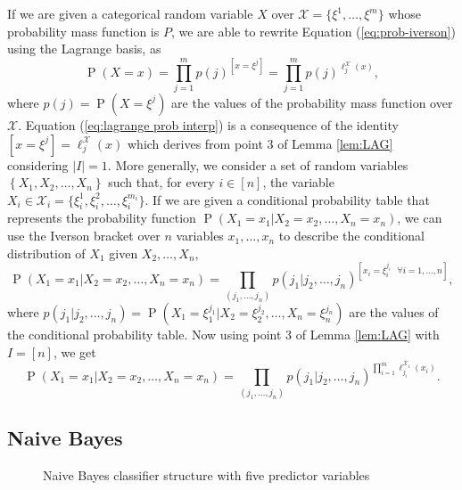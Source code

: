 \documentclass[11pt,a4paper, twoside]{book}
\newcommand{\Pp}{\operatorname{P}}
\newcommand{\nchi}{\mathcal{X}}
\begin{document}
If we are given a categorical random variable $X$ over $\nchi=\{\xi^1,\ldots,\xi^m\}$ whose probability mass function is $P$, we are able to rewrite Equation (\ref{eq:prob-iverson}) using the Lagrange basis, as
\begin{equation} \Pp(X=x)=\prod_{j=1}^m p(j)^{[x=\xi^j]}=\prod_{j=1}^m p(j)^{\ell_j^{\nchi}(x)}, 
\label{eq:lagrange prob interp}
\end{equation} 
where $p(j)=\Pp(X=\xi^j)$ are the values of the probability mass function over $\nchi$. Equation (\ref{eq:lagrange prob interp}) is a consequence of the identity $[x=\xi^j]=\ell_j^{\nchi}(x)$ which derives from point 3 of Lemma \ref{lem:LAG} considering $|I|=1$.
More generally, we consider a set of random variables $\left\{X_1, X_2, \ldots, X_n \right\}$ such that, for every $i \in [n]$, the variable $X_i \in \nchi_i=\{\xi_i^1,\xi_i^2,\ldots,\xi_i^{m_i} \}$. If we are given a conditional probability table that represents the probability function $\Pp(X_1=x_1|X_2=x_2,\ldots,X_n=x_n)$, we can use the Iverson bracket over $n$ variables $x_1,\ldots,x_n$ to describe the conditional distribution of $X_1$ given $X_2,\ldots,X_n$,
\[ \Pp\left(X_1=x_1|X_2=x_2,\ldots,X_n=x_n\right)=\prod_{(j_1,\ldots,j_n)} p(j_1|j_2,\ldots,j_n)^{[x_i=\xi_i^{j_i}\text{ } \forall i=1,\ldots,n]} ,\]
where $p(j_1|j_2,\ldots,j_n)=\Pp(X_1=\xi_1^{j_1}|X_2=\xi_2^{j_2},\ldots,X_n=\xi_n^{j_n})$ are the values of the conditional probability table. 
Now using point 3 of Lemma \ref{lem:LAG} with $I=[n]$, we get
\begin{equation}
\label{eq:lagrange prob interp cond}
\Pp\left(X_1=x_1|X_2=x_2,\ldots,X_n=x_n\right)=\prod_{(j_1,\ldots,j_n)} p(j_1|j_2,\ldots,j_n)^{\prod_{i=1}^m \ell_{j_i}^{\nchi_i}(x_i)} .
\end{equation}

\subsection{Naive Bayes}
\label{subsec:NB}
\begin{figure}
\centering
{}  
\caption{Naive Bayes classifier structure with five predictor variables}
\label{fig:NB}
\end{figure}
\end{document}
